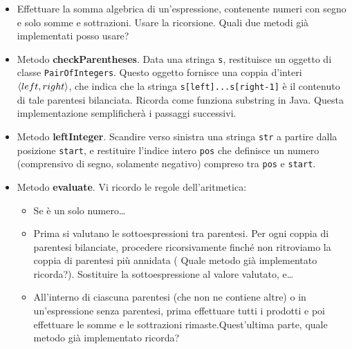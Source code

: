 \documentclass[]{scrartcl}
\begin{document}
\begin{enumerate}
\begin{itemize}
	\item Effettuare la somma algebrica di un'espressione, contenente numeri con segno e solo somme e sottrazioni. {\color{red}Usare la ricorsione. Quali due metodi già implementati posso usare?}
	\item Metodo \textbf{checkParentheses}. Data una stringa \texttt{s}, restituisce un oggetto di classe \texttt{PairOfIntegers}. Questo oggetto fornisce una coppia d'interi $\Braket{left,right}$, che indica che la stringa \texttt{s[left]...s[right-1]} è il contenuto di tale parentesi bilanciata. {\color{red} Ricorda come funziona substring in Java. Questa implementazione semplificherà i passaggi successivi.}
	\item Metodo \textbf{leftInteger}. Scandire verso sinistra una stringa \texttt{str} a partire dalla posizione \texttt{start}, e restituire l'indice intero \texttt{pos} che definisce un numero (comprensivo di segno, solamente negativo) compreso tra \texttt{pos} e \texttt{start}.
	\item Metodo \textbf{evaluate}. Vi ricordo le regole dell'aritmetica:
	\begin{itemize}
		\item Se è un solo numero\dots
		\item Prima si valutano le sottoespressioni tra parentesi. Per ogni coppia di parentesi bilanciate, procedere ricorsivamente finché non ritroviamo la coppia di parentesi più annidata ({\color{red} Quale metodo già implementato ricorda?}). Sostituire la sottoespressione al valore valutato, e\dots 
		\item All'interno di ciascuna parentesi (che non ne contiene altre) o in un'espressione senza parentesi, prima effettuare tutti i prodotti e poi effettuare le somme e le sottrazioni rimaste.{\color{red}Quest'ultima parte, quale metodo già implementato ricorda?}
	\end{itemize}
\end{itemize}
\end{enumerate}
\end{document}
